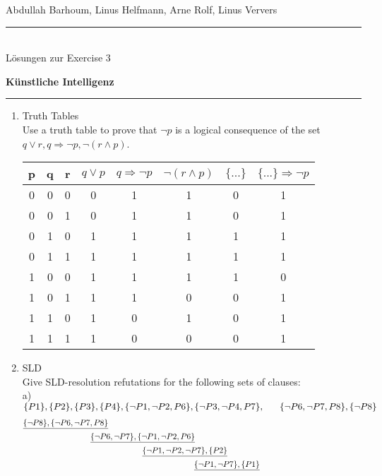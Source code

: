 \documentclass[a4paper,twoside,12pt]{article}
\newcommand{\ZETTELNUMMER}{3}
\newcounter{AUFGNR}
\newcommand{\AUFGABE}[1]{\vspace{0.3cm}\item[Exercise~{\arabic{AUFGNR}}:]\stepcounter{AUFGNR} #1\\[1ex]}
\begin{document}
\pagestyle{plain}
\noindent Abdullah Barhoum, Linus Helfmann, Arne Rolf, Linus Ververs

\hrule\medskip
\rule{0ex}{0ex}\\[-1ex]
Lösungen zur Exercise \ZETTELNUMMER

\smallskip
\noindent
\large
\textbf{Künstliche Intelligenz}
\medskip\hrule

\smallskip
\noindent
\begin{enumerate}[wide=-0.2cm]
	\AUFGABE{Truth Tables}
	Use a truth table to prove that $\neg p$ is a logical consequence of the set ${q \vee r, q \Rightarrow \neg p, \neg (r \wedge p)}$.\\
	\begin{tabular}{|c|c|c|c|c|c|c|c|}
		\hline 
		p & q & r & $q \vee p$ & $q \Rightarrow \neg p$ & $\neg(r \wedge p)$  & $\{...\}$ & $\{...\} \Rightarrow \neg p$  \\ 
		\hline 
		0 & 0 & 0 & 0 & 1 & 1 & 0 & 1 \\ 
		\hline 
		0 & 0 & 1 & 0 & 1 & 1 & 0 & 1 \\ 
		\hline 
		0 & 1 & 0 & 1 & 1 & 1 & 1 & 1 \\ 
		\hline 
		0 & 1 & 1 & 1 & 1 & 1 & 1 & 1 \\ 
		\hline 
		1 & 0 & 0 & 1 & 1 & 1 & 1 & 0 \\ 
		\hline 
		1 & 0 & 1 & 1 & 1 & 0 & 0 & 1 \\ 
		\hline 
		1 & 1 & 0 & 1 & 0 & 1 & 0 & 1 \\ 
		\hline 
		1 & 1 & 1 & 1 & 0 & 0 & 0 & 1 \\ 
		\hline 
	\end{tabular} 
	\AUFGABE{SLD}
	Give SLD-resolution refutations for the following sets of clauses:\\
	a) $\{P1\}, \{P2\}, \{P3\}, \{P4\}, \{\neg P1, \neg P2, P6\}, \{\neg P3, \neg P4, P7\}, \\
	~~~~~ \{\neg P6, \neg P7, P8\}, \{\neg P8\}$
	\begin{align*}
		\underline{\{\neg P8\}, \{\neg P6, \neg P7, P8\}} \hspace{11.65cm}\\
		\underline{\{\neg P6, \neg P7\}, \{\neg P1, \neg P2, P6\}} \hspace{7.9cm} \\
		\underline{\{\neg P1,\neg P2, \neg P7\}, \{P2\}} \hspace{6.5cm} \\
		\underline{\{\neg P1, \neg P7\},\{P1\}} \hspace{5.1cm}\\

\end{align*}
\end{enumerate}
\end{document}
